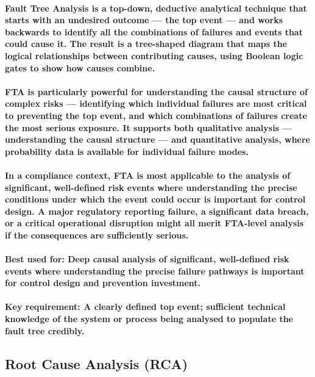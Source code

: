\paragraph{\textbf{Fault Tree Analysis} is a top-down, deductive analytical technique that starts with an undesired outcome — the \textbf{top event} — and works backwards to identify all the combinations of failures and events that could cause it. The result is a tree-shaped diagram that maps the logical relationships between contributing causes, using Boolean logic gates to show how causes combine.}
\paragraph{FTA is particularly powerful for understanding the \textbf{causal structure} of complex risks — identifying which individual failures are most critical to preventing the top event, and which combinations of failures create the most serious exposure. It supports both qualitative analysis — understanding the causal structure — and quantitative analysis, where probability data is available for individual failure modes.}
\paragraph{In a compliance context, FTA is most applicable to the analysis of significant, well-defined risk events where understanding the precise conditions under which the event could occur is important for control design. A major regulatory reporting failure, a significant data breach, or a critical operational disruption might all merit FTA-level analysis if the consequences are sufficiently serious.}
\paragraph{\textbf{Best used for}: Deep causal analysis of significant, well-defined risk events where understanding the precise failure pathways is important for control design and prevention investment.}
\paragraph{\textbf{Key requirement}: A clearly defined top event; sufficient technical knowledge of the system or process being analysed to populate the fault tree credibly.}

\subsection{Root Cause Analysis (RCA)}
